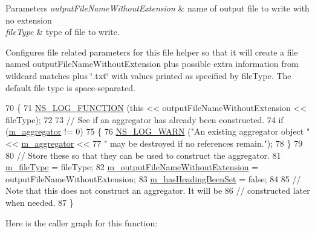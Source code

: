 \begin{DoxyParams}{Parameters}
{\em output\+File\+Name\+Without\+Extension} & name of output file to write with no extension \\
\hline
{\em file\+Type} & type of file to write.\\
\hline
\end{DoxyParams}
Configures file related parameters for this file helper so that it will create a file named output\+File\+Name\+Without\+Extension plus possible extra information from wildcard matches plus \char`\"{}.\+txt\char`\"{} with values printed as specified by file\+Type. The default file type is space-\/separated. 
\begin{DoxyCode}
70 \{
71   \hyperlink{log-macros-disabled_8h_a90b90d5bad1f39cb1b64923ea94c0761}{NS\_LOG\_FUNCTION} (\textcolor{keyword}{this} << outputFileNameWithoutExtension << fileType);
72 
73   \textcolor{comment}{// See if an aggregator has already been constructed.}
74   \textcolor{keywordflow}{if} (\hyperlink{classns3_1_1FileHelper_ac94b4ba749d782ea407482bc699ee436}{m\_aggregator} != 0)
75     \{
76       \hyperlink{group__logging_gade7208b4009cdf0e25783cd26766f559}{NS\_LOG\_WARN} (\textcolor{stringliteral}{"An existing aggregator object "} << \hyperlink{classns3_1_1FileHelper_ac94b4ba749d782ea407482bc699ee436}{m\_aggregator} <<
77                    \textcolor{stringliteral}{" may be destroyed if no references remain."});
78     \}
79 
80   \textcolor{comment}{// Store these so that they can be used to construct the aggregator.}
81   \hyperlink{classns3_1_1FileHelper_a3bd3c31ac1083d2bee0b0987b0a1323f}{m\_fileType} = fileType;
82   \hyperlink{classns3_1_1FileHelper_a65ce7e46c43b018fe5e648d179e7b52e}{m\_outputFileNameWithoutExtension} = outputFileNameWithoutExtension;
83   \hyperlink{classns3_1_1FileHelper_a83e6bfa9d7f2ba769dee7d2b610f957d}{m\_hasHeadingBeenSet} = \textcolor{keyword}{false};
84 
85   \textcolor{comment}{// Note that this does not construct an aggregator. It will be}
86   \textcolor{comment}{// constructed later when needed.}
87 \}
\end{DoxyCode}


Here is the caller graph for this function\+:


